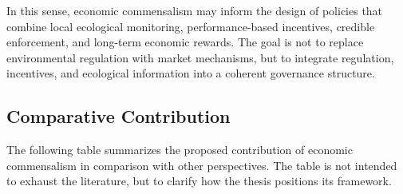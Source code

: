 In this sense, economic commensalism may inform the design of policies that combine local ecological monitoring, performance-based incentives, credible enforcement, and long-term economic rewards. The goal is not to replace environmental regulation with market mechanisms, but to integrate regulation, incentives, and ecological information into a coherent governance structure.

\subsection{Comparative Contribution}

The following table summarizes the proposed contribution of economic commensalism in comparison with other perspectives. The table is not intended to exhaust the literature, but to clarify how the thesis positions its framework.

\renewcommand{\arraystretch}{1.3}

